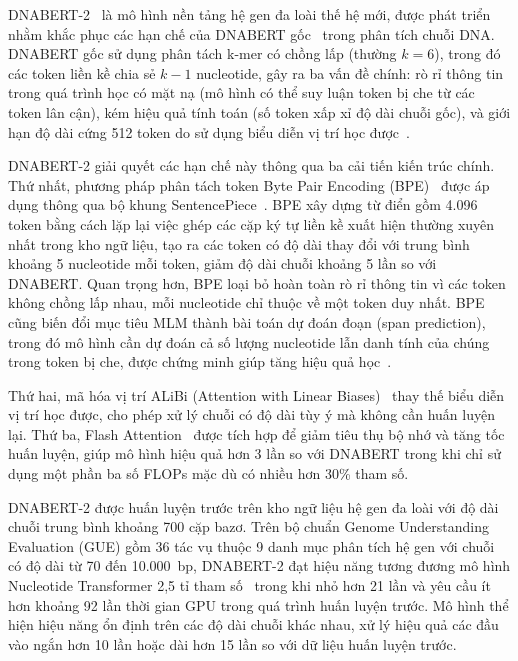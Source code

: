 DNABERT-2~\cite{zhou2023dnabert} là mô hình nền tảng hệ gen đa loài thế hệ mới, được phát triển nhằm khắc phục các hạn chế của DNABERT gốc~\cite{ji2021dnabert} trong phân tích chuỗi DNA. DNABERT gốc sử dụng phân tách k-mer có chồng lấp (thường $k=6$), trong đó các token liền kề chia sẻ $k-1$ nucleotide, gây ra ba vấn đề chính: rò rỉ thông tin trong quá trình học có mặt nạ (mô hình có thể suy luận token bị che từ các token lân cận), kém hiệu quả tính toán (số token xấp xỉ độ dài chuỗi gốc), và giới hạn độ dài cứng 512 token do sử dụng biểu diễn vị trí học được~\cite{zhou2023dnabert}.

DNABERT-2 giải quyết các hạn chế này thông qua ba cải tiến kiến trúc chính. Thứ nhất, phương pháp phân tách token Byte Pair Encoding (BPE)~\cite{sennrich2015neural} được áp dụng thông qua bộ khung SentencePiece~\cite{kudo2018sentencepiece}. BPE xây dựng từ điển gồm 4.096 token bằng cách lặp lại việc ghép các cặp ký tự liền kề xuất hiện thường xuyên nhất trong kho ngữ liệu, tạo ra các token có độ dài thay đổi với trung bình khoảng 5 nucleotide mỗi token, giảm độ dài chuỗi khoảng 5 lần so với DNABERT. Quan trọng hơn, BPE loại bỏ hoàn toàn rò rỉ thông tin vì các token không chồng lấp nhau, mỗi nucleotide chỉ thuộc về một token duy nhất. BPE cũng biến đổi mục tiêu MLM thành bài toán dự đoán đoạn (span prediction), trong đó mô hình cần dự đoán cả số lượng nucleotide lẫn danh tính của chúng trong token bị che, được chứng minh giúp tăng hiệu quả học~\cite{zhou2023dnabert,raffel2020exploring}.

Thứ hai, mã hóa vị trí ALiBi (Attention with Linear Biases)~\cite{press2021train} thay thế biểu diễn vị trí học được, cho phép xử lý chuỗi có độ dài tùy ý mà không cần huấn luyện lại. Thứ ba, Flash Attention~\cite{dao2022flashattention} được tích hợp để giảm tiêu thụ bộ nhớ và tăng tốc huấn luyện, giúp mô hình hiệu quả hơn 3 lần so với DNABERT trong khi chỉ sử dụng một phần ba số FLOPs mặc dù có nhiều hơn 30\% tham số.

DNABERT-2 được huấn luyện trước trên kho ngữ liệu hệ gen đa loài với độ dài chuỗi trung bình khoảng 700 cặp bazơ. Trên bộ chuẩn Genome Understanding Evaluation (GUE) gồm 36 tác vụ thuộc 9 danh mục phân tích hệ gen với chuỗi có độ dài từ 70 đến 10.000~bp, DNABERT-2 đạt hiệu năng tương đương mô hình Nucleotide Transformer 2,5 tỉ tham số~\cite{dalla2025nucleotide} trong khi nhỏ hơn 21 lần và yêu cầu ít hơn khoảng 92 lần thời gian GPU trong quá trình huấn luyện trước. Mô hình thể hiện hiệu năng ổn định trên các độ dài chuỗi khác nhau, xử lý hiệu quả các đầu vào ngắn hơn 10 lần hoặc dài hơn 15 lần so với dữ liệu huấn luyện trước.

